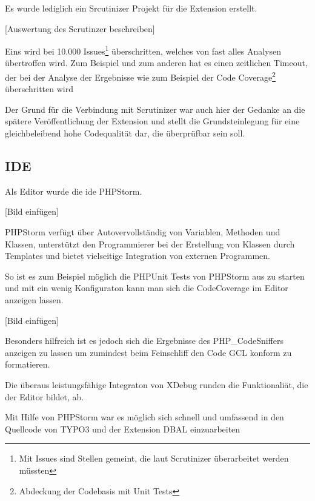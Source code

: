 Es wurde lediglich ein Srcutinizer Projekt für die Extension erstellt.

[Auswertung des Scrutinzer beschreiben]

Eins wird bei 10.000 Issues\footnote{Mit Issues sind Stellen gemeint, die laut Scrutinizer überarbeitet werden müssten} überschritten, welches von fast alles Analysen übertroffen wird. Zum Beispiel und zum anderen hat es einen zeitlichen Timeout, der bei der Analyse der Ergebnisse wie zum Beispiel der Code Coverage\footnote{Abdeckung der Codebasis mit Unit Tests} überschritten wird  

Der Grund für die Verbindung mit Scrutinizer war auch hier der Gedanke an die spätere Veröffentlichung der Extension und stellt die Grundsteinlegung für eine gleichbeleibend hohe Codequalität dar, die überprüfbar sein soll.

\subsection{IDE}
Als Editor wurde die \gls{ide} PHPStorm. 

[Bild einfügen]

PHPStorm verfügt über Autovervollständig von Variablen, Methoden und Klassen, unterstützt den Programmierer bei der Erstellung von Klassen durch Templates und bietet vielseitige Integration von externen Programmen. 

So ist es zum Beispiel möglich die PHPUnit Tests von PHPStorm aus zu starten und mit ein wenig Konfiguraton\cite{web:kowalke14} kann man sich die CodeCoverage im Editor anzeigen lassen.

[Bild einfügen]

Besonders hilfreich ist es jedoch sich die Ergebnisse des PHP\_CodeSniffers anzeigen zu lassen um zumindest beim Feinschliff den Code GCL konform zu formatieren.

Die überaus leistungsfähige Integraton von XDebug runden die Funktionaliät, die der Editor bildet, ab.

Mit Hilfe von PHPStorm war es möglich sich schnell und umfassend in den Quellcode von TYPO3 und der Extension DBAL einzuarbeiten
